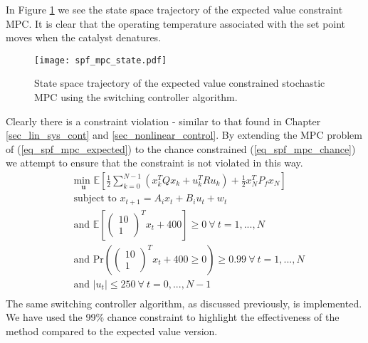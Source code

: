 In Figure \ref{fig_spf_mpc_state} we see the state space trajectory of the expected value constraint MPC. It is clear that the operating temperature associated with the set point moves when the catalyst denatures.
\begin{figure}[H] 
\centering
\texttt{[image: spf\_mpc\_state.pdf]}
\caption{State space trajectory of the expected value constrained stochastic MPC using the switching controller algorithm.}
\label{fig_spf_mpc_state}
\end{figure}
Clearly there is a constraint violation - similar to that found in Chapter \ref{sec_lin_sys_cont} and \ref{sec_nonlinear_control}. By extending the MPC problem of (\ref{eq_spf_mpc_expected}) to the chance constrained (\ref{eq_spf_mpc_chance}) we attempt to ensure that the constraint is not violated in this way. 
\begin{equation}
\begin{aligned}
&\underset{\mathbf{u}}{\text{min }} \mathbb{E}\left[ \frac{1}{2}\sum_{k=0}^{N-1} \left( x_k^TQx_k + u_k^TRu_k \right) + \frac{1}{2}x_N^TP_fx_N \right] \\
& \text{subject to } x_{t+1}=A_ix_t+B_iu_t + w_t\\
& \text{and } \mathbb{E}[\begin{pmatrix}
10 \\ 1
\end{pmatrix}^Tx_t + 400] \geq 0 ~\forall ~t=1,...,N \\
& \text{and } \text{Pr}(\begin{pmatrix}
10 \\ 1
\end{pmatrix}^T x_t + 400 \geq 0) \geq 0.99 ~\forall ~t=1,...,N\\
& \text{and } |u_t| \leq 250 ~\forall ~t=0,...,N-1\\
\end{aligned}
\label{eq_spf_mpc_chance}
\end{equation} 
The same switching controller algorithm, as discussed previously, is implemented. We have used the 99\% chance constraint to highlight the effectiveness of the method compared to the expected value version. 


